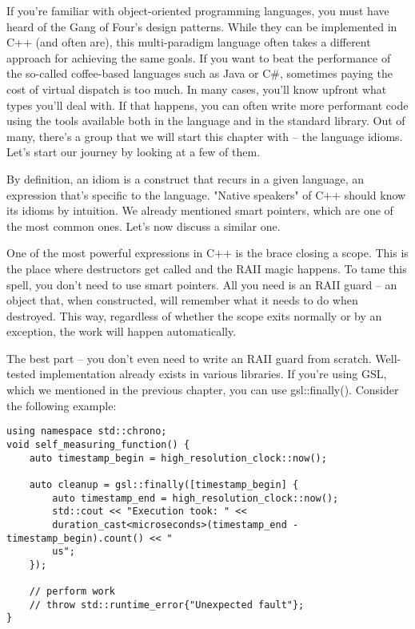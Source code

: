 
If you're familiar with object-oriented programming languages, you must have heard of the Gang of Four's design patterns. While they can be implemented in C++ (and often are), this multi-paradigm language often takes a different approach for achieving the same goals. If you want to beat the performance of the so-called coffee-based languages such as Java or C\#, sometimes paying the cost of virtual dispatch is too much. In many cases, you'll know upfront what types you'll deal with. If that happens, you can often write more performant code using the tools available both in the language and in the standard library. Out of many, there's a group that we will start this chapter with – the language idioms. Let's start our journey by looking at a few of them.

By definition, an idiom is a construct that recurs in a given language, an expression that's specific to the language. "Native speakers" of C++ should know its idioms by intuition. We already mentioned smart pointers, which are one of the most common ones. Let's now discuss a similar one.


One of the most powerful expressions in C++ is the brace closing a scope. This is the place where destructors get called and the RAII magic happens. To tame this spell, you don't need to use smart pointers. All you need is an RAII guard – an object that, when constructed, will remember what it needs to do when destroyed. This way, regardless of whether the scope exits normally or by an exception, the work will happen automatically.

The best part – you don't even need to write an RAII guard from scratch. Well-tested implementation already exists in various libraries. If you're using GSL, which we mentioned in the previous chapter, you can use gsl::finally(). Consider the following example:

\begin{lstlisting}[style=styleCXX]
using namespace std::chrono;
void self_measuring_function() {
	auto timestamp_begin = high_resolution_clock::now();
	
	auto cleanup = gsl::finally([timestamp_begin] {
		auto timestamp_end = high_resolution_clock::now();
		std::cout << "Execution took: " <<
		duration_cast<microseconds>(timestamp_end - timestamp_begin).count() << "
		us";
	});

	// perform work
	// throw std::runtime_error{"Unexpected fault"};
}
\end{lstlisting}

